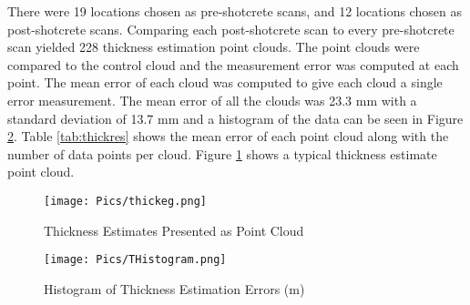 There were 19 locations chosen as pre-shotcrete scans, and 12 locations chosen as post-shotcrete scans. Comparing each post-shotcrete scan to every pre-shotcrete scan yielded 228 thickness estimation point clouds. The point clouds were compared to the control cloud and the measurement error was computed at each point. The mean error of each cloud was computed to give each cloud a single error measurement. The mean error of all the clouds was 23.3 mm with a standard deviation of 13.7 mm and a histogram of the data can be seen in Figure \ref{fig:thist}. Table \ref{tab:thickres} shows the mean error of each point cloud along with the number of data points per cloud. Figure \ref{fig:thickeg} shows a typical thickness estimate point cloud.\\

\begin{figure}
    \centering
    \texttt{[image: Pics/thickeg.png]}
    \caption{Thickness Estimates Presented as Point Cloud}
    \label{fig:thickeg}
\end{figure}

\begin{figure}
    \centering
    \texttt{[image: Pics/THistogram.png]}
    \caption{Histogram of Thickness Estimation Errors (m)}
    \label{fig:thist}
\end{figure}

